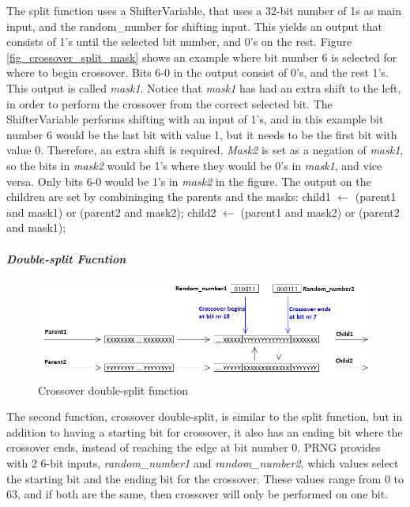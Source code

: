 The split function uses a ShifterVariable, that uses a 32-bit number of 1s as main input, and the random\_number for shifting input.
This yields an output that consists of 1's until the selected bit number, and 0's on the rest.
Figure \ref{fig_crossover_split_mask} shows an example where bit number 6 is selected for where to begin crossover. 
Bits 6-0 in the output consist of 0's, and the rest 1's.
This output is called \emph{mask1}. Notice that \emph{mask1} has had an extra shift to the left, in order to perform the crossover from the correct selected bit. 
The ShifterVariable performs shifting with an input of 1's, and in this example bit number 6 would be the last bit with value 1, but it needs to be the first bit with value 0. Therefore, an extra shift is required.
\emph{Mask2} is set as a negation of \emph{mask1}, so the bits in \emph{mask2} would be 1's where they would be 0's in \emph{mask1}, and vice versa.
Only bits 6-0 would be 1's in \emph{mask2} in the figure.
The output on the children are set by combininging the parents and the masks:
\linebreak
\linebreak child1 $\leftarrow$ (parent1 and mask1) or (parent2 and mask2);
\linebreak child2 $\leftarrow$ (parent1 and mask2) or (parent2 and mask1);
\linebreak {}

\paragraph{\textit{Double-split Fucntion}}
\begin{figure}[H]
\includegraphics[width=\textwidth]{fpga/fig/crossover_doublesplit.png}
\caption{Crossover double-split function}
\label{fig_crossover_doublesplit}
\end{figure}

The second function, crossover double-split, is similar to the split function, but in addition to having a starting bit for crossover, it also has an ending bit where the crossover ends, instead of reaching the edge at bit number 0.
PRNG provides with 2 6-bit inputs, \emph{random\_number1} and \emph{random\_number2}, which values select the starting bit and the ending bit for the crossover.
These values range from 0 to 63, and if both are the same, then crossover will only be performed on one bit.

